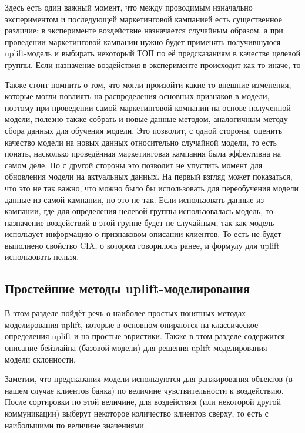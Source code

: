 Здесь есть один важный момент, что между проводимым изначально экспериментом и последующей маркетинговой кампанией есть существенное различие: в эксперименте воздействие назначается случайным образом, а при проведении маркетинговой кампании нужно будет применять получившуюся uplift-модель и выбирать некоторый ТОП по её предсказаниям в качестве целевой группы. Если назначение воздействия в эксперименте происходит как-то иначе, то 

Также стоит помнить о том, что могли произойти какие-то внешние изменения, которые могли повлиять на распределения основных признаков в модели, поэтому при проведении самой маркетинговой компании на основе полученной модели, полезно также собрать и новые данные методом, аналогичным методу сбора данных для обучения модели. Это позволит, с одной стороны, оценить качество модели на новых данных относительно случайной модели, то есть понять, насколько проведённая маркетинговая кампания была эффективна на самом деле. Но с другой стороны это позволит не упустить момент для обновления модели на актуальных данных. На первый взгляд может показаться, что это не так важно, что можно было бы использовать для переобучения модели данные из самой кампании, но это не так. Если использовать данные из кампании, где для определения целевой группы использовалась модель, то назначение воздействий в этой группе будет не случайным, так как модель использует информацию о признаковом описании клиентов. То есть не будет выполнено свойство CIA, о котором говорилось ранее, и формулу для uplift использовать нельзя.















\subsection{Простейшие методы uplift-моделирования}

В этом разделе пойдёт речь о наиболее простых понятных методах моделирования uplift, которые в основном опираются на классическое определения uplift и на простые эвристики. Также в этом разделе содержится описание бейзлайна (базовой модели) для решения uplift-моделирования -- модели склонности.

Заметим, что предсказания модели используются для ранжирования объектов (в нашем случае клиентов банка) по величине чувствительности к воздействию. После сортировки по этой величине, для воздействия (или некоторой другой коммуникации) выберут некоторое количество клиентов сверху, то есть с наибольшими по величине значениями.

